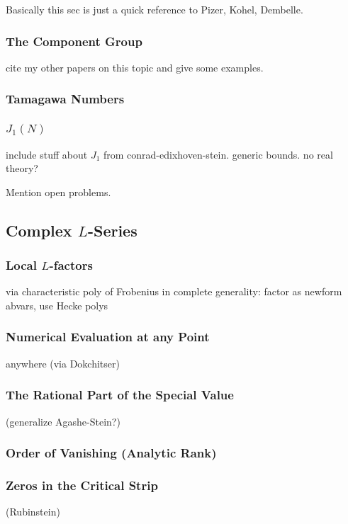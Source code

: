 \documentclass{article}
\begin{document}
Basically this sec is just a quick reference to Pizer, Kohel, Dembelle.

\subsubsection{The Component Group}
cite my other papers on this topic and give some examples.

\subsubsection{Tamagawa Numbers}

\subsubsection{$J_1(N)$}
include stuff about $J_1$ from conrad-edixhoven-stein.  generic
bounds.  no real theory?

Mention open problems.

\subsection{Complex $L$-Series}


\subsubsection{Local $L$-factors}
 via characteristic poly of Frobenius in complete
generality: factor as newform abvars, use Hecke polys


\subsubsection{Numerical Evaluation at any Point}
 anywhere (via Dokchitser)

\subsubsection{The Rational Part of the Special Value}
 (generalize Agashe-Stein?)

\subsubsection{Order of Vanishing (Analytic Rank)}

\subsubsection{Zeros in the Critical Strip}
 (Rubinstein)
\end{document}
